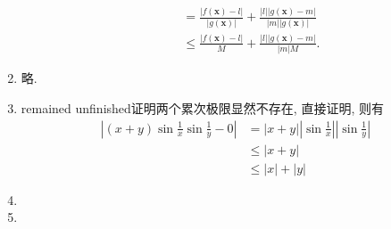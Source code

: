 \documentclass[a4paper, 11pt]{ctexart}
\begin{document}
\begin{enumerate}
\begin{enumerate}[(1)]
\begin{align*}
                        &= \frac{|f(\boldsymbol{x}) - l|}{|g(\boldsymbol{x})|} + \frac{|l||g(\boldsymbol{x}) - m|}{|m||g(\boldsymbol{x})|} \\
                        &\leqslant \frac{|f(\boldsymbol{x}) - l|}{M} + \frac{|l||g(\boldsymbol{x}) - m|}{|m|M}.
                    \end{align*}
            \end{enumerate}
        \item %
            略.
        \item %
            {\color{red} remained unfinished}{\heiti 证明}\quad 两个累次极限显然不存在, 直接证明, 则有
            \begin{align*}
                \left| (x+y)\sin\frac1x\sin\frac1y - 0 \right| &= \left| x + y \right|\left|\sin\frac1x\right|\left|\sin\frac1y\right| \\
                &\leqslant |x+y| \\
                &\leqslant |x| + |y|
            \end{align*}
        \item %
        \item %
    \end{enumerate}
\end{document}
